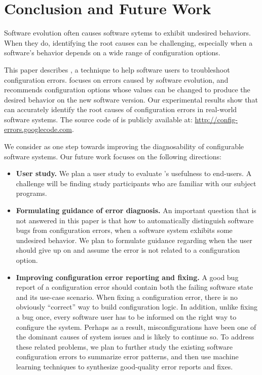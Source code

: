 \section{Conclusion and Future Work}
\label{sec:conclusion}

Software evolution often causes software sytems to
exhibit undesired behaviors.
When they do, identifying the root causes
can be challenging, especially when a software's
behavior depends on a wide range of configuration options.

This paper describes \ourtool, a technique to help software
users to troubleshoot configuration errors. \ourtool
focuses on errors caused by software evolution, and
recommends configuration options whose values can be changed to
produce the desired behavior on the new software version.
Our experimental results show that \ourtool
can accurately identify the root causes of
\errornum configuration errors in \subjnum real-world software systems.
The source code of \ourtool is publicly available
at: \url{http://config-errors.googlecode.com}.

We consider \ourtool as one step towards improving
the diagnosability of configurable software systems.
Our future work focuses on the following directions:

\vspace{-2mm}

\begin{itemize}
\item \textbf{User study.} We plan a user study to evaluate
\ourtool's usefulness to end-users. A challenge
will be finding study participants who are familiar
with our subject programs.

\item \textbf{Formulating guidance of error diagnosis.}
An important question that is not answered in this paper
is that how to automatically distinguish software bugs from 
configuration errors, when a software system exhibits
some undesired behavior. We plan to formulate guidance
regarding when the user should give up on \ourtool
and assume the error is not related to a configuration option.

\item \textbf{Improving configuration error reporting and fixing.}
A good bug report of a configuration error should contain both the
failing software state and its use-case scenario.
When fixing a configuration error, there is no obviously ``correct'' way to
build configuration logic. In addition, unlike fixing a bug once,
every software user has to be informed on the right way to
configure the system. Perhaps as a result, misconfigurations
have been one of the dominant causes of system issues and
is likely to continue so. To address these related problems,
we plan to further study the existing software configuration errors
to summarize error patterns, and then use machine learning
techniques to synthesize good-quality error reports and fixes.

\end{itemize}
